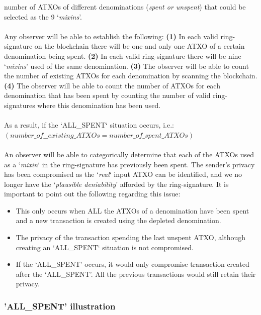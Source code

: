 number of ATXOs of different denominations (\textit{spent or unspent})
that could be selected as the 9 ‘\textit{mixins}’.
\\
\\
\noindent
Any observer will be able to establish the following: \textbf{(1)} In each
valid ring-signature on the blockchain there will be one and only one ATXO
of a certain denomination being spent. \textbf{(2)} In each valid
ring-signature there will be nine ‘\textit{mixins}’ used of the same
denomination. \textbf{(3)} The observer will be able to count the number
of existing ATXOs for each denomination by scanning the blockchain.
\textbf{(4)} The observer will be able to count the number of ATXOs for
each denomination that has been spent by counting the number of valid
ring-signatures where this denomination has been used.
\\
\\
\noindent
As a result, if the ‘ALL\_SPENT‘ situation occurs, i.e.:
\\
\noindent
$(number\_of\_\_existing\_ATXOs = number\_of\_spent\_ATXOs)$
\\
\\
\noindent
An observer will be able to categorically determine that each of the ATXOs
used as a ‘\textit{mixin}‘ in the ring-signature has previously been spent.
The sender’s privacy has been compromised as the ‘\textit{real}‘ input ATXO
can be identified, and we no longer have the ‘\textit{plausible deniability}’
afforded by the ring-signature. It is important to point out the following
regarding this issue:



\begin{itemize}
	\item This only occurs when ALL the ATXOs of a denomination have been
	spent and a new transaction is created using the depleted denomination.
	\item The privacy of the transaction spending the last unspent ATXO,
	although creating an ‘ALL\_SPENT‘ situation is not compromised.
	\item If the ‘ALL\_SPENT’ occurs, it would only compromise transaction
	created after the ‘ALL\_SPENT’. All the previous transactions would still
	retain their privacy.
\end{itemize}



\subsubsection{'ALL\_SPENT' illustration}

